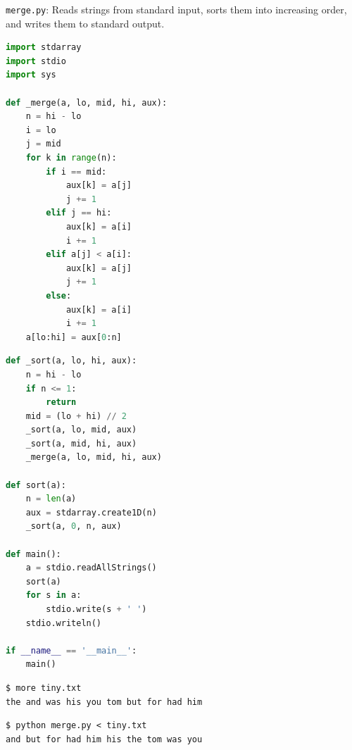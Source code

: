 \documentclass[8pt,a4paper,compress,handout]{beamer}
\begin{document}
\begin{frame}[fragile]
\begin{framed}
\tiny \lstinline{merge.py}: Reads strings from standard input, sorts them into increasing order, and writes them to standard output.
\end{framed}

\begin{lstlisting}[language=Python]
import stdarray
import stdio
import sys

def _merge(a, lo, mid, hi, aux):
    n = hi - lo
    i = lo
    j = mid
    for k in range(n):
        if i == mid:
            aux[k] = a[j]
            j += 1
        elif j == hi:
            aux[k] = a[i]
            i += 1
        elif a[j] < a[i]:
            aux[k] = a[j]
            j += 1
        else:
            aux[k] = a[i]
            i += 1
    a[lo:hi] = aux[0:n]
\end{lstlisting}
\end{frame}

\begin{frame}[fragile]
\begin{lstlisting}[language=Python]
def _sort(a, lo, hi, aux):
    n = hi - lo
    if n <= 1:
        return
    mid = (lo + hi) // 2
    _sort(a, lo, mid, aux)
    _sort(a, mid, hi, aux)
    _merge(a, lo, mid, hi, aux)

def sort(a):
    n = len(a)
    aux = stdarray.create1D(n)
    _sort(a, 0, n, aux)

def main():
    a = stdio.readAllStrings()
    sort(a)
    for s in a:
        stdio.write(s + ' ')
    stdio.writeln()

if __name__ == '__main__':
    main()
\end{lstlisting}

\begin{lstlisting}[language={}]
$ more tiny.txt 
the and was his you tom but for had him
\end{lstlisting}

\begin{lstlisting}[language={}]
$ python merge.py < tiny.txt 
and but for had him his the tom was you 
\end{lstlisting}
\end{frame}
\end{document}
